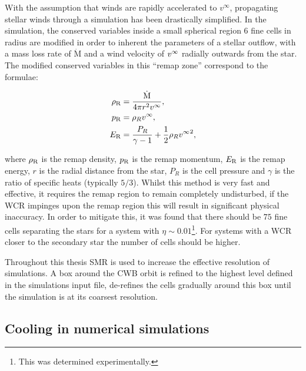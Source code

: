 With the assumption that winds are rapidly accelerated to $v^\infty$, propagating stellar winds through a simulation has been drastically simplified.
In the simulation, the conserved variables inside a small spherical region 6 fine cells in radius are modified in order to inherent the parameters of a stellar outflow, with a mass loss rate of $\dot{\text{M}}$ and a wind velocity of $v^\infty$ radially outwards from the star.
The modified conserved variables in this ``remap zone'' correspond to the formulae:

\begin{subequations}
  \begin{align}
    \rho_\text{R} &= \frac{\dot{\text{M}}}{4 \pi r^2 v^\infty}, \\
    p_\text{R}    &= \rho_R v^\infty, \\
    E_\text{R}    &= \frac{P_R}{\gamma - 1} + \frac{1}{2} \rho_R {v^\infty}^2,
  \end{align}
\end{subequations}

\noindent
where $\rho_\text{R}$ is the remap density, $p_\text{R}$ is the remap momentum, $E_\text{R}$ is the remap energy, $r$ is the radial distance from the star, $P_R$ is the cell pressure and $\gamma$ is the ratio of specific heats (typically $5/3$).
Whilst this method is very fast and effective, it requires the remap region to remain completely undisturbed, if the WCR impinges upon the remap region this will result in significant physical inaccuracy.
In order to mitigate this, it was found that there should be $75$ fine cells separating the stars for a system with $\eta\sim 0.01$\footnote{This was determined experimentally.}.
For systems with a WCR closer to the secondary star the number of cells should be higher.
 
Throughout this thesis SMR is used to increase the effective resolution of simulations.
A box around the CWB orbit is refined to the highest level defined in the simulations input file, \athena{} de-refines the cells gradually around this box until the simulation is at its coarsest resolution.

\subsection{Cooling in numerical simulations}

